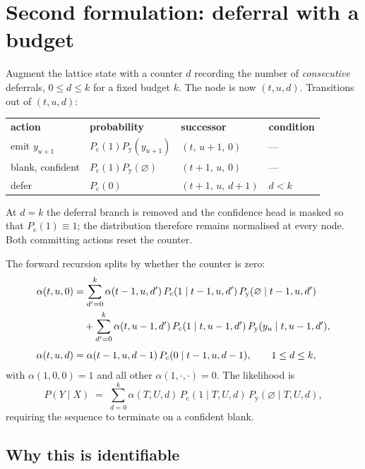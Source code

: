 \documentclass[11pt]{article}
\newcommand{\blank}{\varnothing}
\newcommand{\Py}{P_{\mathrm{y}}}
\newcommand{\Pc}{P_{\mathrm{c}}}
\begin{document}
\section{Second formulation: deferral with a budget}
\label{sec:budget}

Augment the lattice state with a counter $d$ recording the number of
\emph{consecutive} deferrals, $0 \le d \le k$ for a fixed budget $k$. The node is
now $(t,u,d)$. Transitions out of $(t,u,d)$:

\begin{center}
\begin{tabular}{llll}
\textbf{action} & \textbf{probability} & \textbf{successor} & \textbf{condition} \\[2pt]
emit $y_{u+1}$               & $\Pc(1)\Py(y_{u+1})$ & $(t,\,u+1,\,0)$ & --- \\
blank, confident             & $\Pc(1)\Py(\blank)$  & $(t+1,\,u,\,0)$ & --- \\
defer                        & $\Pc(0)$             & $(t+1,\,u,\,d+1)$ & $d < k$ \\
\end{tabular}
\end{center}

At $d = k$ the deferral branch is removed and the confidence head is masked so
that $\Pc(1) \equiv 1$; the distribution therefore remains normalised at every
node. Both committing actions reset the counter.

The forward recursion splits by whether the counter is zero:
\begin{align}
  \alpha(t,u,0) &= \sum_{d'=0}^{k} \alpha(t-1,u,d')\,
                     \Pc(1 \mid t-1,u,d')\,\Py(\blank \mid t-1,u,d') \notag \\
                &\quad + \sum_{d'=0}^{k} \alpha(t,u-1,d')\,
                     \Pc(1 \mid t,u-1,d')\,\Py(y_u \mid t,u-1,d'),
  \label{eq:budget0} \\[4pt]
  \alpha(t,u,d) &= \alpha(t-1,u,d-1)\,\Pc(0 \mid t-1,u,d-1),
                   \qquad 1 \le d \le k,
  \label{eq:budgetd}
\end{align}
with $\alpha(1,0,0)=1$ and all other $\alpha(1,\cdot,\cdot)=0$. The likelihood is
\begin{equation}
  P(Y \mid X) \;=\; \sum_{d=0}^{k} \alpha(T,U,d)\,
                    \Pc(1 \mid T,U,d)\,\Py(\blank \mid T,U,d),
\end{equation}
requiring the sequence to terminate on a confident blank.

\subsection{Why this is identifiable}
\end{document}
